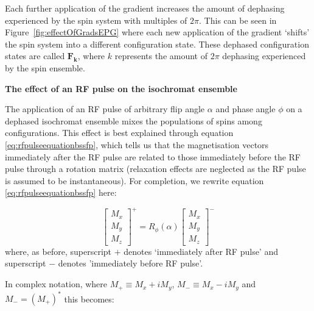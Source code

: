 \hfill

Each further application of the gradient increases the amount of dephasing experienced by the spin system with multiples of $2\pi$.
This can be seen in Figure~\ref{fig:effectOfGradsEPG} where each new application of the gradient `shifts' the spin system into a different configuration state.
These dephased configuration states are called $\bm{F_k}$, where $k$ represents the amount of $2\pi$ dephasing experienced by the spin ensemble.

\hfill

\textbf{The effect of an RF pulse on the isochromat ensemble} 

The application of an RF pulse of arbitrary flip angle $\alpha$ and phase angle $\phi$ on a dephased isochromat ensemble mixes the populations of spins among configurations.
This effect is best explained through equation \ref{eq:rfpulseequationbssfp}, which tells us that the magnetisation vectors immediately after the RF pulse are related to those immediately before the RF pulse through a rotation matrix (relaxation effects are neglected as the RF pulse is assumed to be instantaneous).
For completion, we rewrite equation \ref{eq:rfpulseequationbssfp} here:

\begin{equation}
    \begin{bmatrix} 
    M_x \\
    M_y \\
    M_z
    \end{bmatrix}^+ = 
        R_{\phi}(\alpha)
    \begin{bmatrix} 
    M_x \\
    M_y \\
    M_z
    \end{bmatrix}^-
\end{equation}
where, as before, superscript $+$ denotes `immediately after RF pulse' and superscript $-$ denotes 'immediately before RF pulse'.

\hfill

In complex notation, where $M_+ \equiv M_x + i M_y$,  $M_- \equiv M_x - i M_y$ and $M_- = (M_+)^*$ this becomes:

